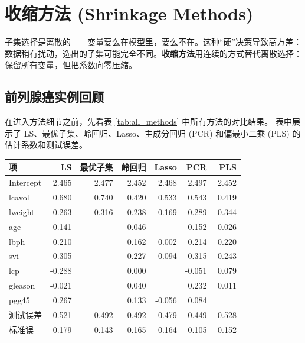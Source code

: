 \section{收缩方法 (Shrinkage Methods)}

子集选择是离散的——变量要么在模型里，要么不在。这种``硬''决策导致高方差：
数据稍有扰动，选出的子集可能完全不同。\textbf{收缩方法}用连续的方式替代离散选择：
保留所有变量，但把系数向零压缩。

\subsection{前列腺癌实例回顾}

在进入方法细节之前，先看表 \ref{tab:all_methods} 中所有方法的对比结果。
表中展示了 LS、最优子集、岭回归、Lasso、主成分回归 (PCR) 和偏最小二乘 (PLS) 的估计系数和测试误差。

\begin{center}
\renewcommand{\arraystretch}{1.2}
\small
\begin{tabular}{l|r|r|r|r|r|r}
\toprule
\textbf{项} & \textbf{LS} & \textbf{最优子集} & \textbf{岭回归} & \textbf{Lasso} & \textbf{PCR} & \textbf{PLS} \\
\midrule
Intercept &  2.465 & 2.477 & 2.452 & 2.468 & 2.497 & 2.452 \\
lcavol    &  0.680 & 0.740 & 0.420 & 0.533 & 0.543 & 0.419 \\
lweight   &  0.263 & 0.316 & 0.238 & 0.169 & 0.289 & 0.344 \\
age       & -0.141 &       & -0.046 &       & -0.152 & -0.026 \\
lbph      &  0.210 &       &  0.162 & 0.002 &  0.214 &  0.220 \\
svi       &  0.305 &       &  0.227 & 0.094 &  0.315 &  0.243 \\
lcp       & -0.288 &       &  0.000 &       & -0.051 &  0.079 \\
gleason   & -0.021 &       &  0.040 &       &  0.232 &  0.011 \\
pgg45     &  0.267 &       &  0.133 & -0.056 &  0.084 &       \\
\midrule
测试误差   & 0.521 & 0.492 & 0.492 & 0.479 & 0.449 & 0.528 \\
标准误     & 0.179 & 0.143 & 0.165 & 0.164 & 0.105 & 0.152 \\
\bottomrule
\end{tabular}
\label{tab:all_methods}
\end{center}

